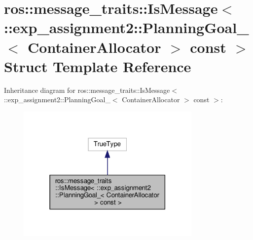 \hypertarget{structros_1_1message__traits_1_1IsMessage_3_01_1_1exp__assignment2_1_1PlanningGoal___3_01ContainerAllocator_01_4_01const_01_4}{}\section{ros\+:\+:message\+\_\+traits\+:\+:Is\+Message$<$ \+:\+:exp\+\_\+assignment2\+:\+:Planning\+Goal\+\_\+$<$ Container\+Allocator $>$ const $>$ Struct Template Reference}
\label{structros_1_1message__traits_1_1IsMessage_3_01_1_1exp__assignment2_1_1PlanningGoal___3_01ContainerAllocator_01_4_01const_01_4}


Inheritance diagram for ros\+:\+:message\+\_\+traits\+:\+:Is\+Message$<$ \+:\+:exp\+\_\+assignment2\+:\+:Planning\+Goal\+\_\+$<$ Container\+Allocator $>$ const $>$\+:
\nopagebreak
\begin{figure}[H]
\begin{center}
\leavevmode
\includegraphics[width=255pt]{structros_1_1message__traits_1_1IsMessage_3_01_1_1exp__assignment2_1_1PlanningGoal___3_01Contain91f0a04dcbe6a87e721536951389ca18}
\end{center}
\end{figure}


